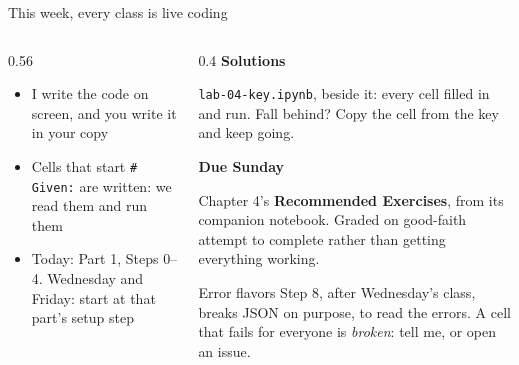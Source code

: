 \documentclass[9pt,aspectratio=169]{beamer}
\begin{document}
\begin{frame}{This week, every class is live coding}
\begin{columns}[T]
\begin{column}{0.56\textwidth}
            \medskip
            \begin{itemize}\small
                \item I write the code on screen, and you write it in your copy
                \item Cells that start \texttt{\# Given:} are written: we read them and run them
                \item Today: Part 1, Steps 0--4. Wednesday and Friday: start at that part's setup step
            \end{itemize}
        \end{column}
        \begin{column}{0.4\textwidth}
            \textbf{Solutions}\\[2pt]
            {\footnotesize \texttt{lab-04-key.ipynb}, beside it: every cell filled in and run. Fall behind? Copy the cell from the key and keep going.\par}
            \medskip
            \textbf{Due Sunday}\\[2pt]
            {\footnotesize Chapter 4's \textbf{Recommended Exercises}, from its companion notebook. Graded on good-faith attempt to complete rather than getting everything working.\par}
            \medskip
            \begin{alertblock}{Error flavors}
                \footnotesize Step 8, after Wednesday's class, breaks JSON on purpose, to read the errors. A cell that fails for everyone is \textit{broken}: tell me, or open an issue.
            \end{alertblock}
        \end{column}
    \end{columns}
\end{frame}
\end{document}

